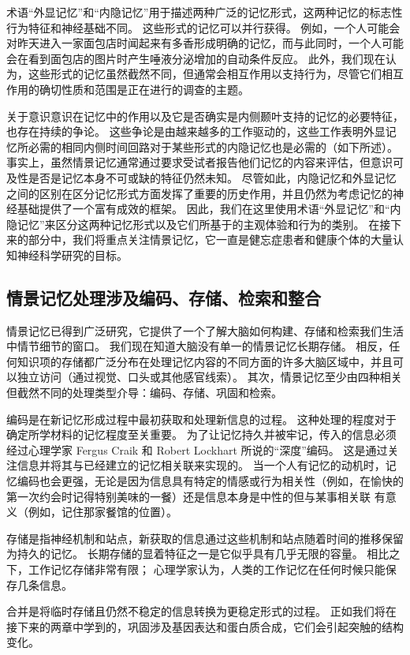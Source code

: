 术语“外显记忆”和“内隐记忆”用于描述两种广泛的记忆形式，这两种记忆的标志性行为特征和神经基础不同。 这些形式的记忆可以并行获得。 例如，一个人可能会对昨天进入一家面包店时闻起来有多香形成明确的记忆，而与此同时，一个人可能会在看到面包店的图片时产生唾液分泌增加的自动条件反应。 此外，我们现在认为，这些形式的记忆虽然截然不同，但通常会相互作用以支持行为，尽管它们相互作用的确切性质和范围是正在进行的调查的主题。

关于意识意识在记忆中的作用以及它是否确实是内侧颞叶支持的记忆的必要特征，也存在持续的争论。 这些争论是由越来越多的工作驱动的，这些工作表明外显记忆所必需的相同内侧时间回路对于某些形式的内隐记忆也是必需的（如下所述）。 事实上，虽然情景记忆通常通过要求受试者报告他们记忆的内容来评估，但意识可及性是否是记忆本身不可或缺的特征仍然未知。 尽管如此，内隐记忆和外显记忆之间的区别在区分记忆形式方面发挥了重要的历史作用，并且仍然为考虑记忆的神经基础提供了一个富有成效的框架。 因此，我们在这里使用术语“外显记忆”和“内隐记忆”来区分这两种记忆形式以及它们所基于的主观体验和行为的类别。 在接下来的部分中，我们将重点关注情景记忆，它一直是健忘症患者和健康个体的大量认知神经科学研究的目标。

\subsection{情景记忆处理涉及编码、存储、检索和整合}
情景记忆已得到广泛研究，它提供了一个了解大脑如何构建、存储和检索我们生活中情节细节的窗口。 我们现在知道大脑没有单一的情景记忆长期存储。 相反，任何知识项的存储都广泛分布在处理记忆内容的不同方面的许多大脑区域中，并且可以独立访问（通过视觉、口头或其他感官线索）。 其次，情景记忆至少由四种相关但截然不同的处理类型介导：编码、存储、巩固和检索。

编码是在新记忆形成过程中最初获取和处理新信息的过程。 这种处理的程度对于确定所学材料的记忆程度至关重要。 为了让记忆持久并被牢记，传入的信息必须经过心理学家 Fergus Craik 和 Robert Lockhart 所说的“深度”编码。 这是通过关注信息并将其与已经建立的记忆相关联来实现的。 当一个人有记忆的动机时，记忆编码也会更强，无论是因为信息具有特定的情感或行为相关性（例如，在愉快的第一次约会时记得特别美味的一餐）还是信息本身是中性的但与某事相关联 有意义（例如，记住那家餐馆的位置）。

存储是指神经机制和站点，新获取的信息通过这些机制和站点随着时间的推移保留为持久的记忆。 长期存储的显着特征之一是它似乎具有几乎无限的容量。 相比之下，工作记忆存储非常有限； 心理学家认为，人类的工作记忆在任何时候只能保存几条信息。

合并是将临时存储且仍然不稳定的信息转换为更稳定形式的过程。 正如我们将在接下来的两章中学到的，巩固涉及基因表达和蛋白质合成，它们会引起突触的结构变化。

